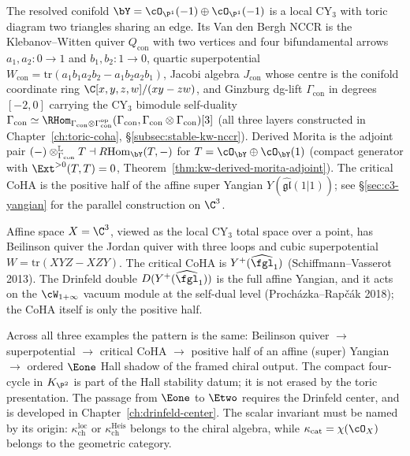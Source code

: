 \begin{example}
\label{ex:conifold-derived}
The resolved conifold $\bY = \cO_{\P^1}(-1) \oplus \cO_{\P^1}(-1)$ is a local CY$_3$ with toric diagram two triangles sharing an edge. Its Van den Bergh NCCR is the Klebanov--Witten quiver $Q_{\mathrm{con}}$ with two vertices and four bifundamental arrows $a_1, a_2 : 0 \to 1$ and $b_1, b_2 : 1 \to 0$, quartic superpotential $W_{\mathrm{con}} = \mathrm{tr}(a_1 b_1 a_2 b_2 - a_1 b_2 a_2 b_1)$, Jacobi algebra $J_{\mathrm{con}}$ whose centre is the conifold coordinate ring $\C[x,y,z,w]/(xy - zw)$, and Ginzburg dg-lift $\Gamma_{\mathrm{con}}$ in degrees $[-2, 0]$ carrying the CY$_3$ bimodule self-duality $\Gamma_{\mathrm{con}} \simeq \RHom_{\Gamma_{\mathrm{con}} \otimes \Gamma_{\mathrm{con}}^{\mathrm{op}}}(\Gamma_{\mathrm{con}}, \Gamma_{\mathrm{con}} \otimes \Gamma_{\mathrm{con}})[3]$ (all three layers constructed in Chapter~\ref{ch:toric-coha}, \S\ref{subsec:stable-kw-nccr}). Derived Morita is the adjoint pair $(-) \otimes^{\mathbb L}_{\Gamma_{\mathrm{con}}} T \dashv R\mathrm{Hom}_{\bY}(T, -)$ for $T = \cO_{\bY} \oplus \cO_{\bY}(1)$ (compact generator with $\Ext^{>0}(T,T) = 0$, Theorem~\ref{thm:kw-derived-morita-adjoint}). The critical CoHA is the positive half of the affine super Yangian $Y(\widehat{\mathfrak{gl}}(1|1))$; see \S\ref{sec:c3-yangian} for the parallel construction on $\C^3$.
\end{example}

\begin{example}
\label{ex:c3-derived}
Affine space $X = \C^3$, viewed as the local CY$_3$ total space over a point, has Beilinson quiver the Jordan quiver with three loops and cubic superpotential $W = \mathrm{tr}(XYZ - XZY)$. The critical CoHA is $Y^+(\widehat{\fgl}_1)$ (Schiffmann--Vasserot 2013). The Drinfeld double $D(Y^+(\widehat{\fgl}_1))$ is the full affine Yangian, and it acts on the $\cW_{1+\infty}$ vacuum module at the self-dual level (Proch\'azka--Rap\v{c}\'ak 2018); the CoHA itself is only the positive half.
\end{example}

Across all three examples the pattern is the same: Beilinson quiver $\to$ superpotential $\to$ critical CoHA $\to$ positive half of an affine (super) Yangian $\to$ ordered $\Eone$ Hall shadow of the framed chiral output. The compact four-cycle in $K_{\P^2}$ is part of the Hall stability datum; it is not erased by the toric presentation. The passage from $\Eone$ to $\Etwo$ requires the Drinfeld center, and is developed in Chapter~\ref{ch:drinfeld-center}. The scalar invariant must be named by its origin: $\kappa_{\mathrm{ch}}^{\mathrm{loc}}$ or $\kappa_{\mathrm{ch}}^{\mathrm{Heis}}$ belongs to the chiral algebra, while $\kappa_{\mathrm{cat}}=\chi(\cO_X)$ belongs to the geometric category.

